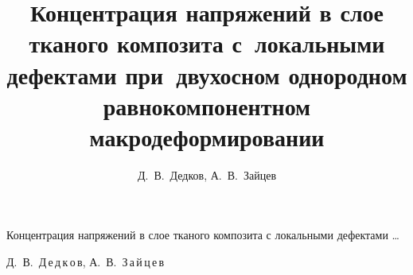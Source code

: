 %

%


%


% 



\renewcommand{\firstpage}{66}

\renewcommand{\lastpage}{75}
















\title{Концентрация напряжений в слое тканого композита с~локальными дефектами при~двухосном однородном равнокомпонентном макродеформировании}%

{Концентрация напряжений в слое тканого композита с локальными дефектами \dots}%



\author{Д.~В.~Дедков, А.~В.~Зайцев}%

{Д.~В.~Д\,е\,д\,к\,о\,в, А.~В.~З\,а\,й\,ц\,е\,в}%










